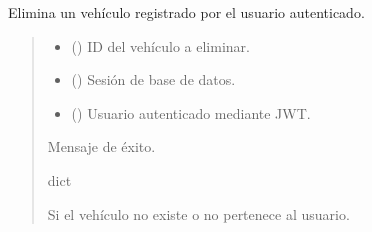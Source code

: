 \documentclass[letterpaper,10pt,spanish]{sphinxmanual}
\begin{document}

\begin{fulllineitems}
\label{\detokenize{modelos:main.eliminar_vehiculo}}
\pysigstartsignatures
\pysiglinewithargsret
{}
{\sphinxparamcomma {}\sphinxparamcomma {}}
{}
\pysigstopsignatures
\sphinxAtStartPar
Elimina un vehículo registrado por el usuario autenticado.
\begin{quote}\begin{description}
\begin{itemize}
\item {} 
\sphinxAtStartPar
{} () \textendash{} ID del vehículo a eliminar.

\item {} 
\sphinxAtStartPar
{} () \textendash{} Sesión de base de datos.

\item {} 
\sphinxAtStartPar
{} ({\hyperref[\detokenize{modelos:main.Usuario}]{}}) \textendash{} Usuario autenticado mediante JWT.

\end{itemize}

\sphinxAtStartPar
Mensaje de éxito.

\sphinxAtStartPar
dict

\sphinxAtStartPar
{} \textendash{} Si el vehículo no existe o no pertenece al usuario.

\end{description}\end{quote}

\end{fulllineitems}
\end{document}
